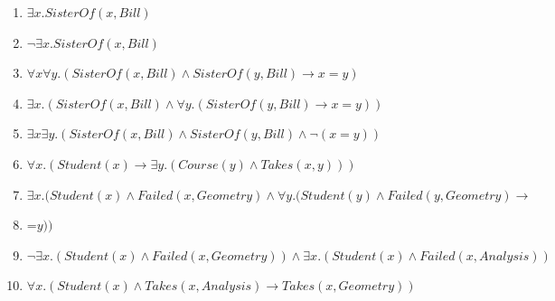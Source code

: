 {\color{sol}
  \begin{enumerate}
\item $\exists x.SisterOf (x, Bill)$
\item $\neg \exists x.SisterOf (x, Bill)$
\item $\forall x\forall y.(SisterOf (x, Bill) \land  SisterOf (y, Bill) \rightarrow x = y)$
\item $\exists x.(SisterOf (x, Bill) \land  \forall y.(SisterOf (y, Bill) \rightarrow x = y))$
\item $\exists x\exists y.(SisterOf (x, Bill) \land  SisterOf (y, Bill) \land  \neg (x = y))$
\item $\forall x.(Student(x) \rightarrow \exists y.(Course(y) \land  T akes(x, y)))$
\item $\exists x.(Student(x)\land F ailed(x, Geometry)\land \forall y.(Student(y)\land F ailed(y, Geometry) →$
\item=$ y))$
\item $\neg \exists x.(Student(x)\land F ailed(x, Geometry))\land \exists x.(Student(x)\land F ailed(x, Analysis))$
\item $\forall x.(Student(x) \land  Takes(x, Analysis) \rightarrow Takes(x, Geometry))$
  \end{enumerate}
}

